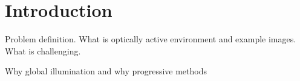 \chapter{Introduction}
Problem definition. What is optically active environment and example images. What is challenging. 

Why global illumination and why progressive methods

%
%   
%
%
%
%
%
%



